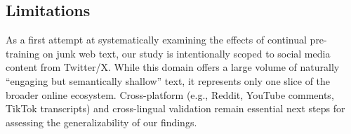 \subsection*{Limitations}

As a first attempt at systematically examining the effects of continual pre-training on junk web text, our study is intentionally scoped to social media content from Twitter/X. While this domain offers a large volume of naturally ``engaging but semantically shallow'' text, it represents only one slice of the broader online ecosystem. Cross-platform (e.g., Reddit, YouTube comments, TikTok transcripts) and cross-lingual validation remain essential next steps for assessing the generalizability of our findings.